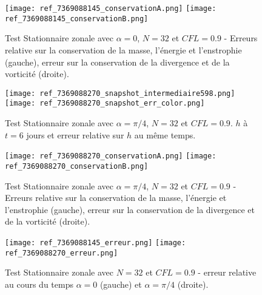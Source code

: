 \begin{figure}[htbp]
\begin{center}
\texttt{[image: ref\_7369088145\_conservationA.png]}
\texttt{[image: ref\_7369088145\_conservationB.png]}
\end{center}
\caption{Test Stationnaire zonale \cite{Williamson1992} avec $\alpha=0$, $N=32$ et $CFL=0.9$ - Erreurs relative sur la conservation de la masse, l'énergie et l'enstrophie (gauche), erreur sur la conservation de la divergence et de la vorticité (droite).}
\label{fig: williamson 2 conservation alpha=0}
\end{figure}




\begin{figure}[htbp]
\begin{center}
\texttt{[image: ref\_7369088270\_snapshot\_intermediaire598.png]}\\
\texttt{[image: ref\_7369088270\_snapshot\_err\_color.png]}
\end{center}
\caption{Test Stationnaire zonale \cite{Williamson1992} avec $\alpha=\pi/4$, $N=32$ et $CFL=0.9$. $h$ à $t=6$ jours et erreur relative sur $h$ au même temps.}
\label{fig: williamson 2 space alpha=pi/4}
\end{figure}

\begin{figure}[htbp]
\begin{center}
\texttt{[image: ref\_7369088270\_conservationA.png]}
\texttt{[image: ref\_7369088270\_conservationB.png]}
\end{center}
\caption{Test Stationnaire zonale \cite{Williamson1992} avec $\alpha=\pi/4$, $N=32$ et $CFL=0.9$ - Erreurs relative sur la conservation de la masse, l'énergie et l'enstrophie (gauche), erreur sur la conservation de la divergence et de la vorticité (droite).}
\label{fig: williamson 2 conservation alpha=pi/4}
\end{figure}

\begin{figure}[htbp]
\begin{center}
\texttt{[image: ref\_7369088145\_erreur.png]}
\texttt{[image: ref\_7369088270\_erreur.png]}
\end{center}
\caption{Test Stationnaire zonale \cite{Williamson1992} avec $N=32$ et $CFL=0.9$ - erreur relative au cours du temps $\alpha = 0$ (gauche) et $\alpha = \pi/4$ (droite).}
\label{fig: williamson 2 erreur}
\end{figure}

















